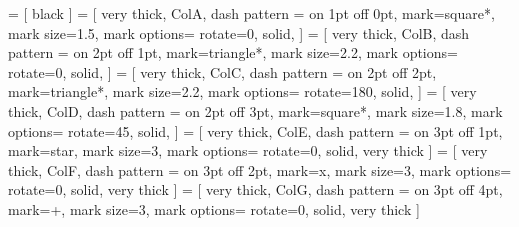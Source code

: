  = [
black
]
 = [
very thick, ColA, dash pattern = {on 1pt off 0pt},
mark=square*, mark size=1.5, mark options={
	rotate=0,
	solid,
}
]
 = [
very thick, ColB, dash pattern = {on 2pt off 1pt},
mark=triangle*, mark size=2.2, mark options={
	rotate=0,
	solid,
}
]
 = [
very thick, ColC, dash pattern = {on 2pt off 2pt},
mark=triangle*, mark size=2.2, mark options={
	rotate=180,
	solid,
}
]
 = [
very thick, ColD, dash pattern = {on 2pt off 3pt},
mark=square*, mark size=1.8, mark options={
	rotate=45,
	solid,
}
]
 = [
very thick, ColE, dash pattern = {on 3pt off 1pt},
mark=star, mark size=3, mark options={
	rotate=0,
	solid,
	very thick
}
]
 = [
very thick, ColF, dash pattern = {on 3pt off 2pt},
mark=x, mark size=3, mark options={
	rotate=0,
	solid,
	very thick
}
]
 = [
very thick, ColG, dash pattern = {on 3pt off 4pt},
mark=+, mark size=3, mark options={
	rotate=0,
	solid,
	very thick
}
]


